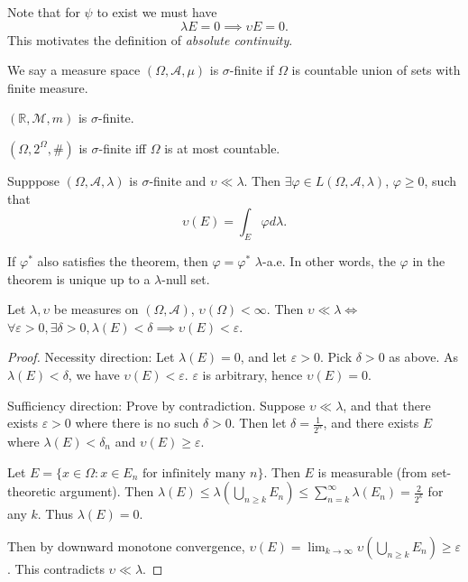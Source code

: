 Note that for $\psi$ to exist we must have
\[
	\lambda E = 0 \implies \upsilon E =0
.\] 
This motivates the definition of \textit{absolute continuity}.




\begin{definition}
	We say a measure space $(\Omega, \mathcal{A}, \mu)$ is $\sigma$-finite if $\Omega$ is countable union of sets with finite measure.
\end{definition}
\begin{example}
	$(\mathbb{R}, \mathcal{M}, m)$ is $\sigma$-finite.

	$(\Omega, 2^\Omega, \#)$ is $\sigma$-finite iff $\Omega$ is at most countable.
\end{example}

\begin{theorem}
	Supppose $(\Omega, \mathcal{A}, \lambda)$ is $\sigma$-finite and $\upsilon \ll \lambda$. Then $\exists  \varphi \in L(\Omega, \mathcal{A}, \lambda)$, $\varphi \ge 0$, such that
	\[
		\upsilon(E) = \int _E \varphi d \lambda
	.\] 
\end{theorem}
\begin{remark}
	If $\varphi^*$ also satisfies the theorem, then $\varphi = \varphi^*$ $\lambda$-a.e. In other words, the $\varphi$ in the theorem is unique up to a $\lambda$-null set.
\end{remark}

\begin{proposition}
	Let $\lambda, \upsilon$ be measures on $(\Omega, \mathcal{A})$, $\upsilon(\Omega) < \infty $. Then $\upsilon \ll\lambda \iff $\\$ \forall  \varepsilon>0, \exists \delta > 0, \lambda(E) < \delta \implies \upsilon(E) < \varepsilon$.
\end{proposition}
\begin{proof}
	Necessity direction: Let $\lambda(E) = 0$, and let $\varepsilon>0$. Pick $\delta>0$ as above. As $\lambda(E) < \delta$, we have $\upsilon(E) < \varepsilon$. $\varepsilon$ is arbitrary, hence $\upsilon(E) = 0$.

	Sufficiency direction: Prove by contradiction. Suppose $\upsilon\ll\lambda$, and that there exists $\varepsilon>0$ where there is no such $\delta>0$. Then let $\delta = \frac{1}{2^n}$, and there exists $E$ where $\lambda(E) < \delta_n$ and $\upsilon(E) \ge  \varepsilon$. 

	Let $E = \{x \in \Omega: x \in E_n \text{ for infinitely many }n\} $. Then $E$ is measurable (from set-theoretic argument). 
	Then $\lambda(E) \le \lambda\left(\bigcup_{n \ge k} E_n\right) \le  \sum_{n=k}^{\infty} \lambda(E_n) = \frac{2}{2^k}$ for any $k$. Thus $\lambda(E) = 0$.

	Then by downward monotone convergence, $\upsilon(E) = \lim_{k \to \infty} \upsilon\left(\bigcup_{n \ge k} E_n\right) \ge \varepsilon$. This contradicts $\upsilon \ll \lambda$.
\end{proof}

